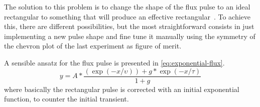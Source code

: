 The solution to this problem is to change the shape of the flux pulse to an ideal rectangular to something that will produce an effective rectangular~\cite{Rol2020, Ferreira2022}.
To achieve this, there are different possibilities, but the most straightforward consists in just implementing a new pulse shape and fine tune it manually using the symmetry of the chevron plot of the last experiment as figure of merit.

A sensible ansatz for the flux pulse is presented in \cref{eq:exponential-flux}.
\begin{equation}\label{eq:exponential-flux}
    y = A * \frac{(\exp(-x/\upsilon)) + g * \exp(-x/\tau)}{1+g}
\end{equation}
where basically the rectangular pulse is corrected with an initial exponential function, to counter the initial transient.



